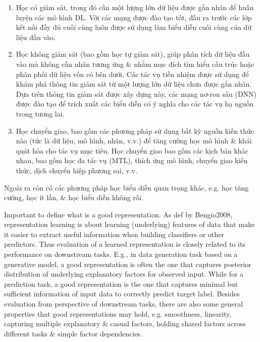\documentclass{article}
\begin{document}
\begin{itemize}
\begin{itemize}
        \begin{enumerate}
            \item Học có giám sát, trong đó cần một lượng lớn dữ liệu được gắn nhãn để huấn luyện các mô hình DL. Với các mạng được đào tạo tốt, đầu ra trước các lớp kết nối đầy đủ cuối cùng luôn được sử dụng làm biểu diễn cuối cùng của dữ liệu đầu vào.
            \item Học không giám sát (bao gồm học tự giám sát), giúp phân tích dữ liệu đầu vào mà không cần nhãn tương ứng \& nhằm mục đích tìm hiểu cấu trúc hoặc phân phối dữ liệu vốn có bên dưới. Các tác vụ tiền nhiệm được sử dụng để khám phá thông tin giám sát từ một lượng lớn dữ liệu chưa được gắn nhãn. Dựa trên thông tin giám sát được xây dựng này, các mạng nơ-ron sâu (DNN) được đào tạo để trích xuất các biểu diễn có ý nghĩa cho các tác vụ hạ nguồn trong tương lai.
            \item Học chuyển giao, bao gồm các phương pháp sử dụng bất kỳ nguồn kiến thức nào (tức là dữ liệu, mô hình, nhãn, v.v.) để tăng cường học mô hình \& khái quát hóa cho tác vụ mục tiêu. Học chuyển giao bao gồm các kịch bản khác nhau, bao gồm học đa tác vụ (MTL), thích ứng mô hình, chuyển giao kiến thức, dịch chuyển hiệp phương sai, v.v.
        \end{enumerate}
        Ngoài ra còn có các phương pháp học biểu diễn quan trọng khác, e.g. học tăng cường, học ít lần, \& học biểu diễn không rối.

        Important to define what is a good representation. As def by Bengio2008, representation learning is about learning (underlying) features of data that make it easier to extract useful information when building classifiers or other predictors. Thus evaluation of a learned representation is closely related to its performance on downstream tasks. E.g., in data generation task based on a generative model, a good representation is often the one that captures posterior distribution of underlying explanatory factors for observed input. While for a prediction task, a good representation is the one that captures minimal but sufficient information of input data to correctly predict target label. Besides evaluation from perspective of downstream tasks, there are also some general properties that good representations may hold, e.g. smoothness, linearity, capturing multiple explanatory \& casual factors, holding shared factors across different tasks \& simple factor dependencies.


\end{itemize}
\end{itemize}
\end{document}
